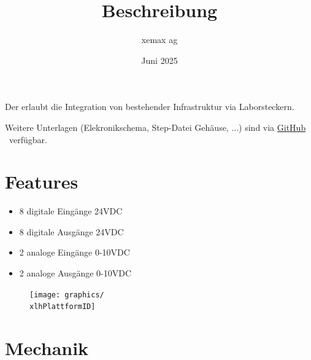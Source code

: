 \documentclass[10pt]{datasheet}
\title{Beschreibung \xlhPlattformID}
\author{xemax ag}
\date{Juni 2025}
\begin{document}
\maketitle



Der \xlhPlattformID erlaubt die Integration von bestehender Infrastruktur via Laborsteckern.

Weitere Unterlagen (Elekronikschema, Step-Datei Gehäuse, ...) sind via
\href{https://github.com/xemax-ag/xLH/}{GitHub \xlhPlattformID}\ verfügbar.

\section{Features}

\begin{itemize}
    \item 8 digitale Eingänge 24VDC
    \item 8 digitale Ausgänge 24VDC
    \item 2 analoge Eingänge 0-10VDC
    \item 2 analoge Ausgänge 0-10VDC
\end{itemize}

%
%
%

\vfill\break

\begin{figure}[h]
    \centering
    \texttt{[image: graphics/\\xlhPlattformID]}
\end{figure}

\section{Mechanik}
\end{document}
